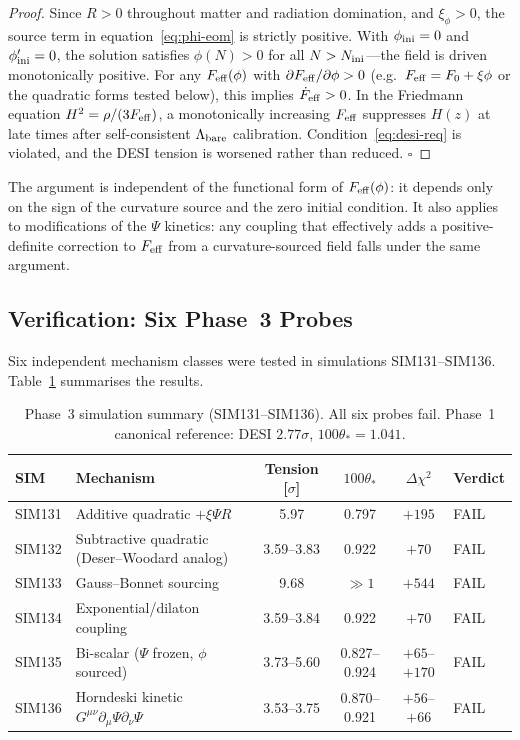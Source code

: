 \documentclass[12pt,a4paper]{article}
\newcommand{\Feff}{F_{\rm eff}}
\newcommand{\Lbare}{\Lambda_{\rm bare}}
\newcommand{\thetastar}{\theta_*}
\theoremstyle{plain}
\begin{document}
\begin{proof}
Since $R>0$ throughout matter and radiation domination, and $\xi_\phi>0$,
the source term in equation~\eqref{eq:phi-eom} is strictly positive. With
$\phi_{\rm ini}=0$ and $\phi'_{\rm ini}=0$, the solution satisfies $\phi(N)>0$
for all $N>N_{\rm ini}$---the field is driven monotonically positive. For any
$\Feff(\phi)$ with $\partial\Feff/\partial\phi>0$ (e.g.\ $\Feff = F_0 + \xi\phi$
or the quadratic forms tested below), this implies $\dot\Feff>0$. In the
Friedmann equation $H^2 = \rho/(3\Feff)$, a monotonically increasing $\Feff$
suppresses $H(z)$ at late times after self-consistent $\Lbare$ calibration.
Condition~\eqref{eq:desi-req} is violated, and the DESI tension is worsened
rather than reduced. $\square$
\end{proof}

The argument is independent of the functional form of $\Feff(\phi)$: it depends
only on the sign of the curvature source and the zero initial condition. It
also applies to modifications of the $\Psi$ kinetics: any coupling that effectively
adds a positive-definite correction to $\Feff$ from a curvature-sourced field
falls under the same argument.

\subsection{Verification: Six Phase~3 Probes}
\label{sec:nogo1-sims}

Six independent mechanism classes were tested in simulations SIM131--SIM136.
Table~\ref{tab:p3summary} summarises the results.

\begin{table}[h!]
\centering
\caption{Phase~3 simulation summary (SIM131--SIM136). All six probes fail.
Phase~1 canonical reference: DESI $2.77\sigma$, $100\thetastar=1.041$.}
\label{tab:p3summary}
\setlength{\tabcolsep}{5pt}
\begin{tabular}{llcccl}
\toprule
SIM & Mechanism & Tension [$\sigma$] & $100\thetastar$ & $\Delta\chi^2$ & Verdict \\
\midrule
SIM131 & Additive quadratic $+\xi\Psi R$              & 5.97       & 0.797         & $+195$ & FAIL \\
SIM132 & Subtractive quadratic (Deser--Woodard analog) & 3.59--3.83 & 0.922         & $+70$  & FAIL \\
SIM133 & Gauss--Bonnet sourcing                        & 9.68       & $\gg1$        & $+544$ & FAIL \\
SIM134 & Exponential/dilaton coupling                  & 3.59--3.84 & 0.922         & $+70$  & FAIL \\
SIM135 & Bi-scalar ($\Psi$ frozen, $\phi$ sourced)    & 3.73--5.60 & 0.827--0.924  & $+65$--$+170$ & FAIL \\
SIM136 & Horndeski kinetic $G^{\mu\nu}\partial_\mu\Psi\partial_\nu\Psi$ & 3.53--3.75 & 0.870--0.921 & $+56$--$+66$ & FAIL \\
\bottomrule
\end{tabular}
\end{table}
\end{document}
